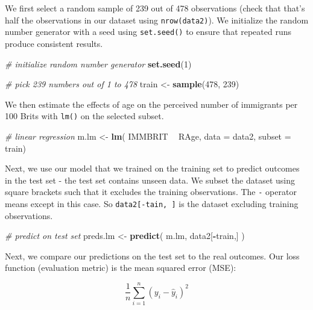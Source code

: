 \documentclass[]{article}
\newenvironment{Shaded}{\begin{snugshade}}{\end{snugshade}}
\newcommand{\CommentTok}[1]{\textcolor[rgb]{0.56,0.35,0.01}{\textit{#1}}}
\newcommand{\DataTypeTok}[1]{\textcolor[rgb]{0.13,0.29,0.53}{#1}}
\newcommand{\DecValTok}[1]{\textcolor[rgb]{0.00,0.00,0.81}{#1}}
\newcommand{\KeywordTok}[1]{\textcolor[rgb]{0.13,0.29,0.53}{\textbf{#1}}}
\newcommand{\NormalTok}[1]{#1}
\newcommand{\OperatorTok}[1]{\textcolor[rgb]{0.81,0.36,0.00}{\textbf{#1}}}
\newcommand{\StringTok}[1]{\textcolor[rgb]{0.31,0.60,0.02}{#1}}
\begin{document}
We first select a random sample of 239 out of 478 observations (check that that's half the observations in our dataset using \texttt{nrow(data2)}). We initialize the random number generator with a seed using \texttt{set.seed()} to ensure that repeated runs produce consistent results.

\begin{Shaded}
\begin{Highlighting}[]
\CommentTok{# initialize random number generator}
\KeywordTok{set.seed}\NormalTok{(}\DecValTok{1}\NormalTok{)}

\CommentTok{# pick 239 numbers out of 1 to 478}
\NormalTok{train <-}\StringTok{ }\KeywordTok{sample}\NormalTok{(}\DecValTok{478}\NormalTok{, }\DecValTok{239}\NormalTok{)}
\end{Highlighting}
\end{Shaded}

We then estimate the effects of age on the perceived number of immigrants per 100 Brits with \texttt{lm()} on the selected subset.

\begin{Shaded}
\begin{Highlighting}[]
\CommentTok{# linear regression}
\NormalTok{m.lm <-}\StringTok{ }\KeywordTok{lm}\NormalTok{( IMMBRIT }\OperatorTok{~}\StringTok{ }\NormalTok{RAge, }\DataTypeTok{data =}\NormalTok{ data2, }\DataTypeTok{subset =}\NormalTok{ train)}
\end{Highlighting}
\end{Shaded}

Next, we use our model that we trained on the training set to predict outcomes in the test set - the test set contains unseen data. We subset the dataset using square brackets such that it excludes the training observations. The \texttt{-} operator means except in this case. So \texttt{data2{[}-tain,\ {]}} is the dataset excluding training observations.

\begin{Shaded}
\begin{Highlighting}[]
\CommentTok{# predict on test set}
\NormalTok{preds.lm <-}\StringTok{ }\KeywordTok{predict}\NormalTok{( m.lm, data2[}\OperatorTok{-}\NormalTok{train,] )}
\end{Highlighting}
\end{Shaded}

Next, we compare our predictions on the test set to the real outcomes. Our loss function (evaluation metric) is the mean squared error (MSE):

\[ \frac{1}{n}\sum_{i=1}^{n}(y_i - \hat{y}_i)^2 \]
\end{document}

